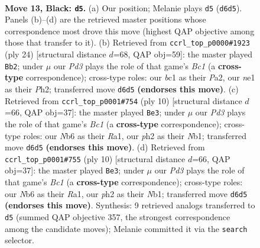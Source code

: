 \documentclass[11pt]{article}
\begin{document}
\clearpage

\begin{figure}[p]\centering
\begin{subfigure}{0.46\textwidth}\centering
\resizebox{\linewidth}{!}{%
\newchessgame
\chessboard[
  setfen={rnbqr1k1/pp3pbp/1n1p2p1/8/3P4/1B6/PP3PPP/RNBQNRK1 b - - 2 13},
  showmover=false,
  pgfstyle=straightmove, color=movearrow, markmove={d6-d5}
]}
\caption{}
\end{subfigure}\hfill
\begin{subfigure}{0.46\textwidth}\centering
\resizebox{\linewidth}{!}{%
\newchessgame
\chessboard[
  setfen={r1b2rk1/p1qn1ppp/1p1bp3/8/3P4/2PB1N2/P4PPP/R1BQR1K1 w - - 0 13},
  showmover=false,
  pgfstyle=straightmove, color=movearrow, markmove={c1-b2}
]}
\caption{}
\end{subfigure}
\\[4pt]
\begin{subfigure}{0.46\textwidth}\centering
\resizebox{\linewidth}{!}{%
\newchessgame
\chessboard[
  setfen={rnbqkbnr/1p3ppp/p2p4/4p3/4P3/1N6/PPP2PPP/RNBQKB1R w KQkq - 0 6},
  showmover=false,
  pgfstyle=straightmove, color=movearrow, markmove={c1-e3}
]}
\caption{}
\end{subfigure}\hfill
\begin{subfigure}{0.46\textwidth}\centering
\resizebox{\linewidth}{!}{%
\newchessgame
\chessboard[
  setfen={rnbqkbnr/1p3ppp/p2p4/4p3/4P3/1N6/PPP2PPP/RNBQKB1R w KQkq - 0 6},
  showmover=false,
  pgfstyle=straightmove, color=movearrow, markmove={c1-e3}
]}
\caption{}
\end{subfigure}
\caption{\textbf{Move 13, Black: \texttt{d5}.} (a) Our position; Melanie plays \texttt{d5} (\texttt{d6d5}). Panels (b)--(d) are the retrieved master positions whose correspondence most drove this move (highest QAP objective among those that transfer to it). (b) Retrieved from \texttt{ccrl\_top\_p0000\#1923} (ply 24) [structural distance $d$=68, QAP obj=59]: the master played \texttt{Bb2}; under $\mu$ our \emph{Pd3} plays the role of that game's \emph{Bc1} (a \textbf{cross-type} correspondence); cross-type roles: our \emph{b}c1 as their \emph{P}a2, our \emph{n}e1 as their \emph{P}h2; transferred move \texttt{d6d5} \textbf{(endorses this move)}. (c) Retrieved from \texttt{ccrl\_top\_p0001\#754} (ply 10) [structural distance $d$=66, QAP obj=37]: the master played \texttt{Be3}; under $\mu$ our \emph{Pd3} plays the role of that game's \emph{Bc1} (a \textbf{cross-type} correspondence); cross-type roles: our \emph{N}b6 as their \emph{R}a1, our \emph{p}h2 as their \emph{N}b1; transferred move \texttt{d6d5} \textbf{(endorses this move)}. (d) Retrieved from \texttt{ccrl\_top\_p0001\#755} (ply 10) [structural distance $d$=66, QAP obj=37]: the master played \texttt{Be3}; under $\mu$ our \emph{Pd3} plays the role of that game's \emph{Bc1} (a \textbf{cross-type} correspondence); cross-type roles: our \emph{N}b6 as their \emph{R}a1, our \emph{p}h2 as their \emph{N}b1; transferred move \texttt{d6d5} \textbf{(endorses this move)}. Synthesis: 9 retrieved analogs transferred to \texttt{d5} (summed QAP objective 357, the strongest correspondence among the candidate moves); Melanie committed it via the \texttt{search} selector.}
\label{fig:thought-m25}
\end{figure}
\end{document}
